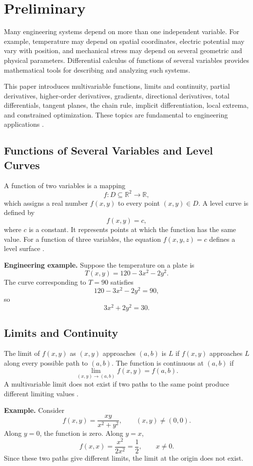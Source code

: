 \documentclass[a4paper,12pt]{article}
\theoremstyle{mystyle}
\numberwithin{equation}{section}
\numberwithin{theorem}{section}
\numberwithin{proposition}{section}
\numberwithin{example}{section}
\numberwithin{remark}{section}
\numberwithin{lemma}{section}
\numberwithin{corollary}{section}
\numberwithin{definition}{section}
\begin{document}
\section{Preliminary}
\label{S:2}
Many engineering systems depend on more than one independent
variable. For example, temperature may depend on spatial coordinates,
electric potential may vary with position, and mechanical stress may
depend on several geometric and physical parameters. Differential
calculus of functions of several variables provides mathematical tools
for describing and analyzing such systems.

This paper introduces multivariable functions, limits and continuity,
partial derivatives, higher-order derivatives, gradients, directional
derivatives, total differentials, tangent planes, the chain rule,
implicit differentiation, local extrema, and constrained optimization.
These topics are fundamental to engineering applications
\cite{openstax2016}.

\subsection{Functions of Several Variables and Level Curves}

A function of two variables is a mapping
\[
f:D\subseteq\mathbb{R}^{2}\longrightarrow\mathbb{R},
\]
which assigns a real number \(f(x,y)\) to every point \((x,y)\in D\).
A level curve is defined by
\[
f(x,y)=c,
\]
where \(c\) is a constant. It represents points at which the function
has the same value. For a function of three variables, the equation
\(f(x,y,z)=c\) defines a level surface \cite{openstax2016}.

\textbf{Engineering example.}
Suppose the temperature on a plate is
\[
T(x,y)=120-3x^2-2y^2.
\]
The curve corresponding to \(T=90\) satisfies
\[
120-3x^2-2y^2=90,
\]
so
\[
3x^2+2y^2=30.
\]

\subsection{Limits and Continuity}

The limit of \(f(x,y)\) as \((x,y)\) approaches \((a,b)\) is \(L\)
if \(f(x,y)\) approaches \(L\) along every possible path to
\((a,b)\). The function is continuous at \((a,b)\) if
\[
\lim_{(x,y)\to(a,b)}f(x,y)=f(a,b).
\]
A multivariable limit does not exist if two paths to the same point
produce different limiting values \cite{openstaxlimits}.

\textbf{Example.}
Consider
\[
f(x,y)=\frac{xy}{x^2+y^2},
\qquad (x,y)\ne(0,0).
\]
Along \(y=0\), the function is zero. Along \(y=x\),
\[
f(x,x)=\frac{x^2}{2x^2}=\frac12,\qquad x\ne0.
\]
Since these two paths give different limits, the limit at the origin
does not exist.
\end{document}
